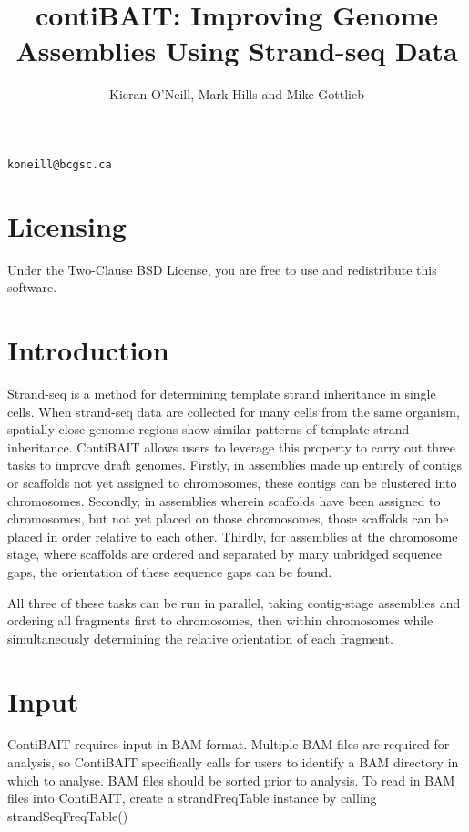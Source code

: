 \documentclass{article}
\title{contiBAIT: Improving Genome Assemblies Using Strand-seq Data}
\author{Kieran O'Neill, Mark Hills and Mike Gottlieb}
\begin{document}


\maketitle
\begin{center}
{\tt koneill@bcgsc.ca}
\end{center}

\textnormal{\normalfont}

\tableofcontents
\newpage

\section{Licensing}
Under the Two-Clause BSD License, you are free to use and redistribute this software.

\section{Introduction}
Strand-seq is a method for determining template strand inheritance in single cells.
When strand-seq data are collected for many cells from the same organism, spatially close genomic regions show similar patterns of template strand inheritance.
ContiBAIT allows users to leverage this property to carry out three tasks to improve draft genomes.
Firstly, in assemblies made up entirely of contigs or scaffolds not yet assigned to chromosomes, these contigs can be clustered into chromosomes.
Secondly, in assemblies wherein scaffolds have been assigned to chromosomes, but not yet placed on those chromosomes, those scaffolds can be placed in order relative to each other. Thirdly, for assemblies at the chromosome stage, where scaffolds are ordered and separated by many unbridged sequence gaps, the orientation of these sequence gaps can be found.  

All three of these tasks can be run in parallel, taking contig-stage assemblies and ordering all fragments first to chromosomes, then within chromosomes while simultaneously determining the relative orientation of each fragment.

\section{Input}
ContiBAIT requires input in BAM format. Multiple BAM files are required for analysis, so ContiBAIT specifically calls for users to identify a BAM directory in which to analyse. BAM files should be sorted prior to analysis.
To read in BAM files into ContiBAIT, create a strandFreqTable instance by calling strandSeqFreqTable() 
\end{document}

